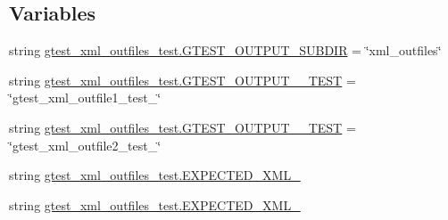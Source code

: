 \subsection*{Variables}
\begin{DoxyCompactItemize}
\item 
string \mbox{\hyperlink{namespacegtest__xml__outfiles__test_a6b3b62791305e64ec137b33bd9351b1a}{gtest\+\_\+xml\+\_\+outfiles\+\_\+test.\+G\+T\+E\+S\+T\+\_\+\+O\+U\+T\+P\+U\+T\+\_\+\+S\+U\+B\+D\+IR}} = \char`\"{}xml\+\_\+outfiles\char`\"{}
\item 
string \mbox{\hyperlink{namespacegtest__xml__outfiles__test_a92ab09e944d010f8abfaa3ca453fa68c}{gtest\+\_\+xml\+\_\+outfiles\+\_\+test.\+G\+T\+E\+S\+T\+\_\+\+O\+U\+T\+P\+U\+T\+\_\+\_\+\+T\+E\+ST}} = \char`\"{}gtest\+\_\+xml\+\_\+outfile1\+\_\+test\+\_\+\char`\"{}
\item 
string \mbox{\hyperlink{namespacegtest__xml__outfiles__test_acf82219e56619aab5c114b6f0a7c3a5e}{gtest\+\_\+xml\+\_\+outfiles\+\_\+test.\+G\+T\+E\+S\+T\+\_\+\+O\+U\+T\+P\+U\+T\+\_\+\_\+\+T\+E\+ST}} = \char`\"{}gtest\+\_\+xml\+\_\+outfile2\+\_\+test\+\_\+\char`\"{}
\item 
string \mbox{\hyperlink{namespacegtest__xml__outfiles__test_a9d7b71e2d97dc7705cbe6e4882824c14}{gtest\+\_\+xml\+\_\+outfiles\+\_\+test.\+E\+X\+P\+E\+C\+T\+E\+D\+\_\+\+X\+M\+L\+\_}}
\item 
string \mbox{\hyperlink{namespacegtest__xml__outfiles__test_a765455244a8cd7b3f32a51f0cda4157e}{gtest\+\_\+xml\+\_\+outfiles\+\_\+test.\+E\+X\+P\+E\+C\+T\+E\+D\+\_\+\+X\+M\+L\+\_}}
\end{DoxyCompactItemize}

